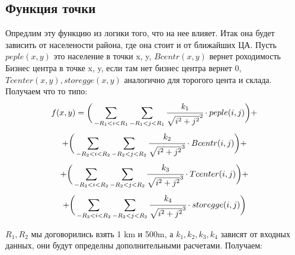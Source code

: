 \documentclass[12pt]{article} %
\begin{document}
 	\subsection{Функция точки}
 	\hspace*{1cm}Опредлим эту функцию из логики того, что на нее влияет. Итак она будет зависить от населености района, где она стоит и от ближайших ЦА. Пусть $peple(x,y)$ это население в точки x, y, $Bcentr(x,y)$ вернет роходимость Бизнес центра в точке x, y, если там нет бизнес центра вернет 0, $Tcenter(x, y), storegge(x,y)$ аналогично для торогого цента и склада. Получаем что то типо:
 	\[f(x, y)= \bigg(\sum_{-R_1<i<R_1}\sum_{-R_1<j<R_1}\cfrac{k_1}{\sqrt{i^2 + j^2}^2}\cdot peple(i,j)\bigg) +\]
 	\[+\bigg( \sum_{-R_2<i<R_2}\sum_{-R_2<j<R_2}\cfrac{k_2}{\sqrt{i^2 + j^2}^3} \cdot Bcentr(i,j) \bigg)+ \]
 	\[+\bigg( \sum_{-R_2<i<R_2}\sum_{-R_2<j<R_2}\cfrac{k_3}{\sqrt{i^2 + j^2}^3} \cdot Tcenter(i,j) \bigg) +\]
 	\[+ \bigg( \sum_{-R_2<i<R_2}\sum_{-R_2<j<R_2}\cfrac{k_4}{\sqrt{i^2 + j^2}^3} \cdot storegge(i,j) \bigg)\] 
 	\par $R_1, R_2$ мы договорились взять 1 km и 500m, а $k_1, k_2, k_3,k_4$ зависят от входных данных, они будут определны дополнительными расчетами. Получаем:
    \begin{verbatim}
    
    \end{verbatim}
 
\end{document}

